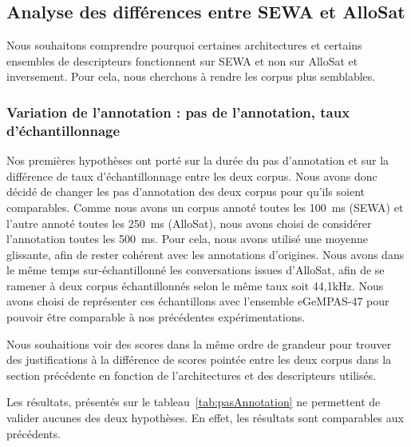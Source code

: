 \subsection{Analyse des différences entre SEWA et AlloSat}
Nous souhaitons comprendre pourquoi certaines architectures et certains ensembles de descripteurs fonctionnent sur SEWA et non sur AlloSat et inversement. Pour cela, nous cherchons à rendre les corpus plus semblables.

\subsubsection{Variation de l'annotation : pas de l'annotation, taux d'échantillonnage}
Nos premières hypothèses ont porté sur la durée du pas d'annotation et sur la différence de taux d'échantillonnage entre les deux corpus. Nous avons donc décidé de changer les pas d'annotation des deux corpus pour qu'ils soient comparables. Comme nous avons un corpus annoté toutes les 100~ms (SEWA) et l'autre annoté toutes les 250~ms (AlloSat), nous avons choisi de considérer l'annotation toutes les 500~ms. Pour cela, nous avons utilisé une moyenne glissante, afin de rester cohérent avec les annotations d'origines. Nous avons dans le même temps sur-échantillonné les conversations issues d'AlloSat, afin de se ramener à deux corpus échantillonnés selon le même taux soit 44,1kHz. Nous avons choisi de représenter ces échantillons avec l'ensemble eGeMPAS-47 pour pouvoir être comparable à nos précédentes expérimentations.

Nous souhaitions voir des scores dans la même ordre de grandeur pour trouver des justifications à la différence de scores pointée entre les deux corpus dans la section précédente en fonction de l'architectures et des descripteurs utilisés.



Les résultats, présentés sur le tableau~\ref{tab:pasAnnotation} ne permettent de valider aucunes des deux hypothèses. En effet, les résultats sont comparables aux précédents.

